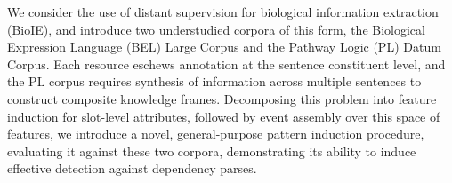 We consider the use of distant supervision for biological information extraction (BioIE), and introduce two understudied corpora of this form, the Biological Expression Language (BEL) Large Corpus and the Pathway Logic (PL) Datum Corpus.  Each resource eschews annotation at the sentence constituent level, and the PL corpus requires synthesis of information across multiple sentences to construct composite knowledge frames.  Decomposing this problem into feature induction for slot-level attributes, followed by event assembly over this space of features, we introduce a novel, general-purpose pattern induction procedure, evaluating it against these two corpora, demonstrating its ability to induce effective detection against dependency parses.
